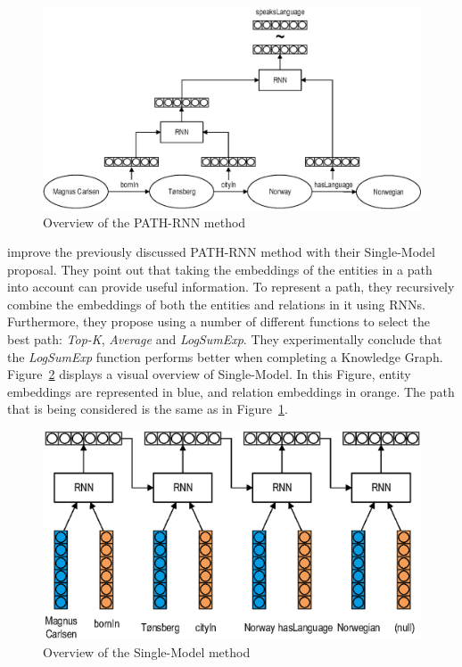 \begin{figure}[!htp]
    \centering
    \includegraphics[width=\textwidth]{fig/paths/pathrnn}
    \caption{Overview of the PATH-RNN method}
    \label{fig:path-rnn}
\end{figure}

\citet{das2017} improve the previously discussed PATH-RNN method with their Single-Model proposal. They point out that taking the embeddings of the entities in a path into account can provide useful information. To represent a path, they recursively combine the embeddings of both the entities and relations in it using RNNs. Furthermore, they propose using a number of different functions to select the best path: \textit{Top-K}, \textit{Average} and \textit{LogSumExp}. They experimentally conclude that the \textit{LogSumExp} function performs better when completing a Knowledge Graph. Figure~\ref{fig:path-single} displays a visual overview of Single-Model. In this Figure, entity embeddings are represented in blue, and relation embeddings in orange. The path that is being considered is the same as in Figure~\ref{fig:path-rnn}.

\begin{figure}[!htp]
    \centering
    \includegraphics[width=.9\textwidth]{fig/paths/singlemodel}
    \caption{Overview of the Single-Model method}
    \label{fig:path-single}
\end{figure}

